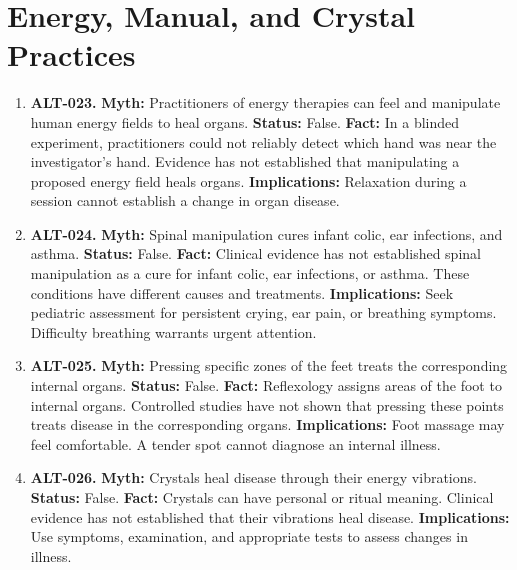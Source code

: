 \documentclass[11pt,oneside]{book}
\begin{document}
\section{Energy, Manual, and Crystal Practices}
\begin{enumerate}[leftmargin=0pt,labelwidth=0pt,labelsep=0pt,itemindent=0pt]
\item[] \textbf{ALT-023.} \textbf{Myth:} Practitioners of energy therapies can feel and manipulate human energy fields to heal organs.\newline
\textbf{Status:} False.\newline
\textbf{Fact:} In a blinded experiment, practitioners could not reliably detect which hand was near the investigator's hand. Evidence has not established that manipulating a proposed energy field heals organs. \cite{ref125}\newline
\textbf{Implications:} Relaxation during a session cannot establish a change in organ disease.
\item[] \textbf{ALT-024.} \textbf{Myth:} Spinal manipulation cures infant colic, ear infections, and asthma.\newline
\textbf{Status:} False.\newline
\textbf{Fact:} Clinical evidence has not established spinal manipulation as a cure for infant colic, ear infections, or asthma. These conditions have different causes and treatments. \cite{ref126}\newline
\textbf{Implications:} Seek pediatric assessment for persistent crying, ear pain, or breathing symptoms. Difficulty breathing warrants urgent attention.
\item[] \textbf{ALT-025.} \textbf{Myth:} Pressing specific zones of the feet treats the corresponding internal organs.\newline
\textbf{Status:} False.\newline
\textbf{Fact:} Reflexology assigns areas of the foot to internal organs. Controlled studies have not shown that pressing these points treats disease in the corresponding organs. \cite{ref127}\newline
\textbf{Implications:} Foot massage may feel comfortable. A tender spot cannot diagnose an internal illness.
\item[] \textbf{ALT-026.} \textbf{Myth:} Crystals heal disease through their energy vibrations.\newline
\textbf{Status:} False.\newline
\textbf{Fact:} Crystals can have personal or ritual meaning. Clinical evidence has not established that their vibrations heal disease. \cite{ref286}\newline
\textbf{Implications:} Use symptoms, examination, and appropriate tests to assess changes in illness.
\end{enumerate}
\end{document}
